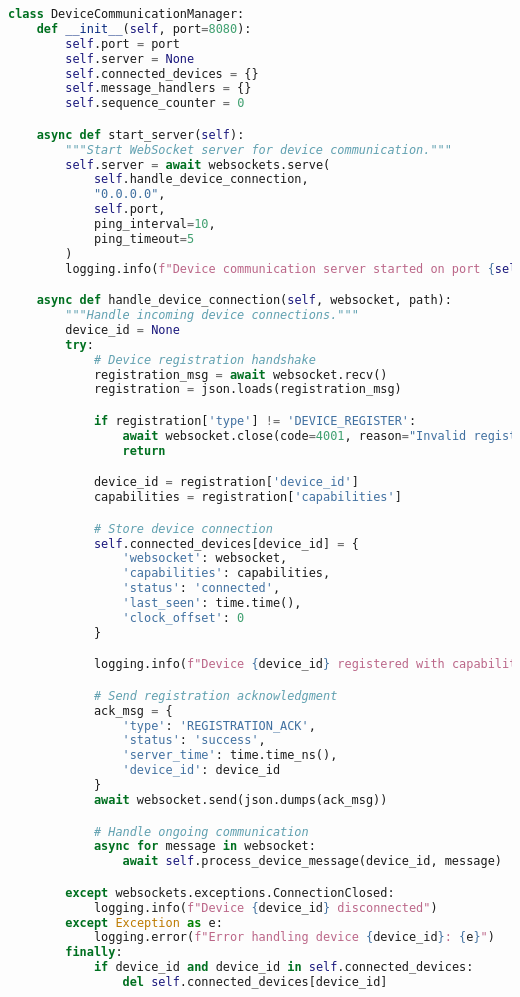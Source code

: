 \begin{lstlisting}[language=Python, caption=Network Communication Implementation]
class DeviceCommunicationManager:
    def __init__(self, port=8080):
        self.port = port
        self.server = None
        self.connected_devices = {}
        self.message_handlers = {}
        self.sequence_counter = 0

    async def start_server(self):
        """Start WebSocket server for device communication."""
        self.server = await websockets.serve(
            self.handle_device_connection,
            "0.0.0.0",
            self.port,
            ping_interval=10,
            ping_timeout=5
        )
        logging.info(f"Device communication server started on port {self.port}")

    async def handle_device_connection(self, websocket, path):
        """Handle incoming device connections."""
        device_id = None
        try:
            # Device registration handshake
            registration_msg = await websocket.recv()
            registration = json.loads(registration_msg)

            if registration['type'] != 'DEVICE_REGISTER':
                await websocket.close(code=4001, reason="Invalid registration")
                return

            device_id = registration['device_id']
            capabilities = registration['capabilities']

            # Store device connection
            self.connected_devices[device_id] = {
                'websocket': websocket,
                'capabilities': capabilities,
                'status': 'connected',
                'last_seen': time.time(),
                'clock_offset': 0
            }

            logging.info(f"Device {device_id} registered with capabilities: {capabilities}")

            # Send registration acknowledgment
            ack_msg = {
                'type': 'REGISTRATION_ACK',
                'status': 'success',
                'server_time': time.time_ns(),
                'device_id': device_id
            }
            await websocket.send(json.dumps(ack_msg))

            # Handle ongoing communication
            async for message in websocket:
                await self.process_device_message(device_id, message)

        except websockets.exceptions.ConnectionClosed:
            logging.info(f"Device {device_id} disconnected")
        except Exception as e:
            logging.error(f"Error handling device {device_id}: {e}")
        finally:
            if device_id and device_id in self.connected_devices:
                del self.connected_devices[device_id]


\end{lstlisting}
